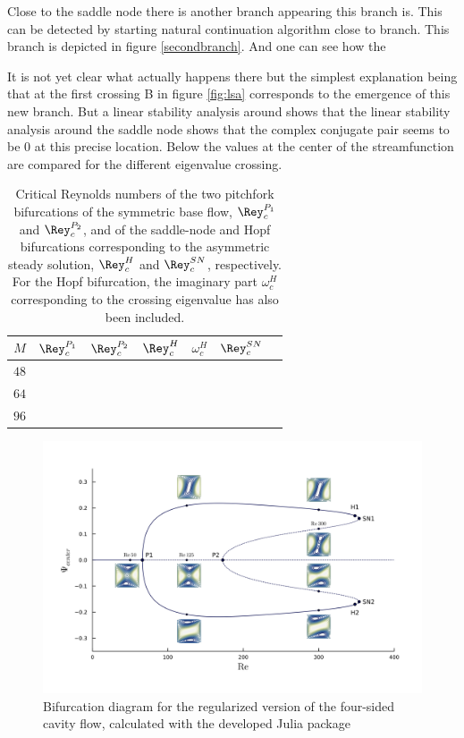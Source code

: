 Close to the saddle node there is another branch appearing this branch is. This
can be detected by starting natural continuation algorithm close to branch.
This branch is depicted in figure \ref{secondbranch}. And one can see how the

It
is not yet clear what actually happens there but the simplest explanation being
that at the first crossing B in figure \ref{fig:lsa} corresponds to the
emergence of this new branch. But a linear stability analysis around shows that
the linear stability analysis around the saddle node shows that the complex
conjugate pair seems to be 0 at this precise location. Below the values at the
center of the streamfunction are compared for the different eigenvalue crossing.

\begin{table}[h!]
  \caption{\Psi
    Critical Reynolds numbers of the two
    pitchfork bifurcations of the symmetric base flow, $\Rey_c^{P_1}$
    and $\Rey_c^{P_2}$, and of the saddle-node and Hopf bifurcations
    corresponding to the asymmetric steady solution, $\Rey_c^{H}$ and
    $\Rey_c^{SN}$, respectively. For the Hopf bifurcation, the imaginary part
    $\omega_c^{H}$ corresponding to the crossing eigenvalue has also been
    included.}
  \label{tab:re_crit}
\begin{tabular}{crrrrrr}
$M$ & $\Rey_c^{P_1}$ & $\Rey_c^{P_2}$ & $\Rey_c^{H}$ &  $\omega_c^{H}$ & $\Rey_c^{SN}$  \\
\hline
$48$ &  & &          &          &   \\
$64$ &  & &          &          &   \\
$96$ &  & &          &          &   \\
\end{tabular}
\end{table}

\begin{figure}[h!]
  \begin{center}
  \includegraphics[width=\textwidth]{figs/bifurcation_diag64x64.png}
  \end{center}
  \label{fig:bif_diag}
  \caption{Bifurcation diagram for the regularized version of the four-sided
    cavity flow, calculated with the developed Julia package} 
\end{figure}

